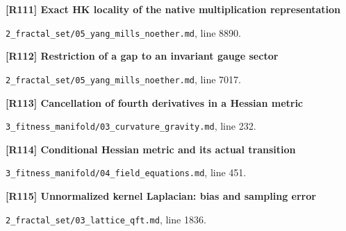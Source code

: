 \documentclass[11pt,a4paper]{article}
\begin{document}
\par\medskip\noindent\begin{minipage}{\linewidth}\textbf{[R111] Exact HK locality of the native multiplication representation}\label{src:thm-ym-native-multiplication-locality}\par
{\small\texttt{}\par
\nolinkurl{2_fractal_set/05_yang_mills_noether.md}, line 8890.\par}
\end{minipage}\par

\par\medskip\noindent\begin{minipage}{\linewidth}\textbf{[R112] Restriction of a gap to an invariant gauge sector}\label{src:thm-gauge-sector-mass-gap}\par
{\small\texttt{}\par
\nolinkurl{2_fractal_set/05_yang_mills_noether.md}, line 7017.\par}
\end{minipage}\par

\par\medskip\noindent\begin{minipage}{\linewidth}\textbf{[R113] Cancellation of fourth derivatives in a Hessian metric}\label{src:lem-curvature-hessian-cancellation}\par
{\small\texttt{}\par
\nolinkurl{3_fitness_manifold/03_curvature_gravity.md}, line 232.\par}
\end{minipage}\par

\par\medskip\noindent\begin{minipage}{\linewidth}\textbf{[R114] Conditional Hessian metric and its actual transition}\label{src:thm-algorithmic-conditional-metric-law}\par
{\small\texttt{}\par
\nolinkurl{3_fitness_manifold/04_field_equations.md}, line 451.\par}
\end{minipage}\par

\par\medskip\noindent\begin{minipage}{\linewidth}\textbf{[R115] Unnormalized kernel Laplacian: bias and sampling error}\label{src:thm-laplacian-convergence}\par
{\small\texttt{}\par
\nolinkurl{2_fractal_set/03_lattice_qft.md}, line 1836.\par}
\end{minipage}\par
\end{document}
